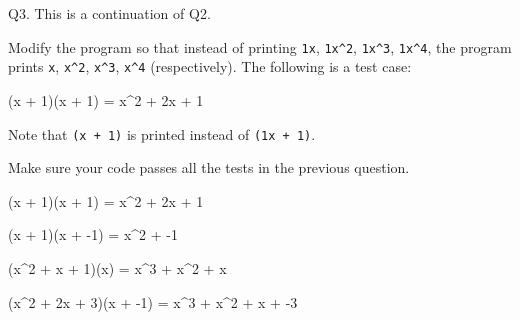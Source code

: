 Q3. This is a continuation of Q2.

Modify the program so that instead of printing 
\verb!1x!, 
\verb!1x^2!, 
\verb!1x^3!, 
\verb!1x^4!, the program prints 
\verb!x!, \verb!x^2!, \verb!x^3!, \verb!x^4! 
(respectively). 
The following is a test case:
\begin{console}[commandchars=\\\{\}]
(x + 1)(x + 1) = x^2 + 2x + 1
\end{console}
Note that \verb!(x + 1)! is printed instead of  \verb!(1x + 1)!.

Make sure your code passes all the tests in the previous question.

\resett
\nextt
\begin{console}[commandchars=\\\{\}]
(x + 1)(x + 1) = x^2 + 2x + 1
\end{console}

\nextt
\begin{console}[commandchars=\\\{\}]
(x + 1)(x + -1) = x^2 + -1
\end{console}

\nextt
\begin{console}[commandchars=\\\{\}]
(x^2 + x + 1)(x) = x^3 + x^2 + x
\end{console}

\nextt
\begin{console}[commandchars=\\\{\}]
(x^2 + 2x + 3)(x + -1) = x^3 + x^2 + x + -3
\end{console}
